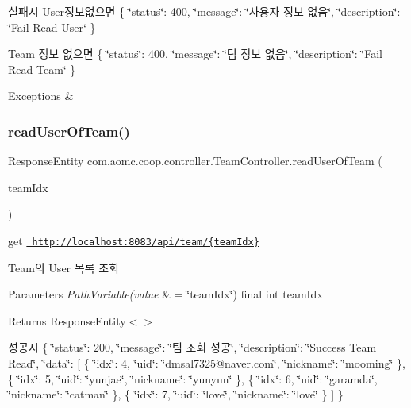 실패시 User정보없으면 \{ \char`\"{}status\char`\"{}\+: 400, \char`\"{}message\char`\"{}\+: \char`\"{}사용자 정보 없음\char`\"{}, \char`\"{}description\char`\"{}\+: \char`\"{}\+Fail Read User\char`\"{} \}

Team 정보 없으면 \{ \char`\"{}status\char`\"{}\+: 400, \char`\"{}message\char`\"{}\+: \char`\"{}팀 정보 없음\char`\"{}, \char`\"{}description\char`\"{}\+: \char`\"{}\+Fail Read Team\char`\"{} \}


\begin{DoxyExceptions}{Exceptions}
{\em } & \\
\hline
\end{DoxyExceptions}
\mbox{\label{classcom_1_1aomc_1_1coop_1_1controller_1_1_team_controller_a422d0eed591df12749b1dcdf9bdb606a}} 
\subsubsection{\texorpdfstring{readUserOfTeam()}{readUserOfTeam()}}
{\footnotesize\ttfamily Response\+Entity com.\+aomc.\+coop.\+controller.\+Team\+Controller.\+read\+User\+Of\+Team (\begin{DoxyParamCaption}\item[{@Path\+Variable(value=\char`\"{}team\+Idx\char`\"{}) final int}]{team\+Idx }\end{DoxyParamCaption})}



get \href{http://localhost:8083/api/team/{teamIdx}}{\texttt{ http\+://localhost\+:8083/api/team/\{team\+Idx\}}} 

Team의 User 목록 조회


\begin{DoxyParams}{Parameters}
{\em Path\+Variable(value} & = \char`\"{}team\+Idx\char`\"{}) final int team\+Idx\\
\hline
\end{DoxyParams}
\begin{DoxyReturn}{Returns}
Response\+Entity$<$$>$
\end{DoxyReturn}
성공시 \{ \char`\"{}status\char`\"{}\+: 200, \char`\"{}message\char`\"{}\+: \char`\"{}팀 조회 성공\char`\"{}, \char`\"{}description\char`\"{}\+: \char`\"{}\+Success Team Read\char`\"{}, \char`\"{}data\char`\"{}\+: \mbox{[} \{ \char`\"{}idx\char`\"{}\+: 4, \char`\"{}uid\char`\"{}\+: \char`\"{}dmsal7325@naver.\+com\char`\"{}, \char`\"{}nickname\char`\"{}\+: \char`\"{}mooming\char`\"{} \}, \{ \char`\"{}idx\char`\"{}\+: 5, \char`\"{}uid\char`\"{}\+: \char`\"{}yunjae\char`\"{}, \char`\"{}nickname\char`\"{}\+: \char`\"{}yunyun\char`\"{} \}, \{ \char`\"{}idx\char`\"{}\+: 6, \char`\"{}uid\char`\"{}\+: \char`\"{}garamda\char`\"{}, \char`\"{}nickname\char`\"{}\+: \char`\"{}catman\char`\"{} \}, \{ \char`\"{}idx\char`\"{}\+: 7, \char`\"{}uid\char`\"{}\+: \char`\"{}love\char`\"{}, \char`\"{}nickname\char`\"{}\+: \char`\"{}love\char`\"{} \} \mbox{]} \}

